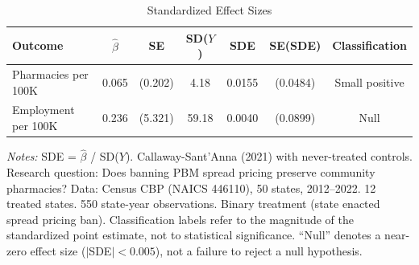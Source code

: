 \begin{table}[htbp]
\centering
\caption{Standardized Effect Sizes}
\label{tab:sde}
\begin{threeparttable}
\begin{tabular}{lcccccc}
\toprule
Outcome & $\hat{\beta}$ & SE & SD($Y$) & SDE & SE(SDE) & Classification \\
\midrule
Pharmacies per 100K & 0.065 & (0.202) & 4.18 & 0.0155 & (0.0484) & Small positive \\
Employment per 100K & 0.236 & (5.321) & 59.18 & 0.0040 & (0.0899) & Null \\
\bottomrule
\end{tabular}
\begin{tablenotes}[flushleft]\small
\item \textit{Notes:} SDE = $\hat{\beta}$ / SD($Y$). Callaway-Sant'Anna (2021) with never-treated controls. Research question: Does banning PBM spread pricing preserve community pharmacies? Data: Census CBP (NAICS 446110), 50 states, 2012--2022. 12 treated states. 550 state-year observations. Binary treatment (state enacted spread pricing ban). Classification labels refer to the magnitude of the standardized point estimate, not to statistical significance. ``Null'' denotes a near-zero effect size ($|$SDE$| < 0.005$), not a failure to reject a null hypothesis.
\end{tablenotes}
\end{threeparttable}
\end{table}
